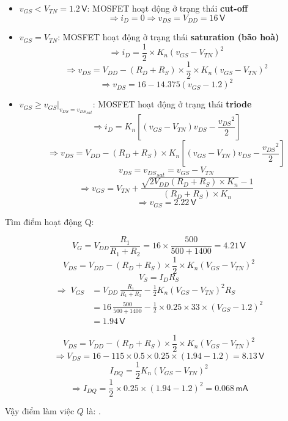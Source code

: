 \begin{itemize}[label=-]
	\item $v_{GS}<V_{TN}=1.2\,\textsf{V}$: MOSFET hoạt động ở trạng thái \textbf{cut-off}  
	\[
	\Rightarrow i_{D}=0 \Rightarrow v_{DS}=V_{DD}=16\,\textsf{V}
	\]
	
	\item $v_{GS}=V_{TN}$: MOSFET hoạt động ở trạng thái \textbf{saturation (bão hoà)}  
	\[
	\Rightarrow i_{D}=\frac{1}{2}\times K_{n}\left(v_{GS}-V_{TN}\right)^{2}
	\]
	\[
	\Rightarrow v_{DS}=V_{DD}-\left(R_{D}+R_{S}\right)\times\frac{1}{2}\times K_{n}\left(v_{GS}-V_{TN}\right)^{2}
	\]
	\[
	\Rightarrow v_{DS}=16-14.375\left(v_{GS}-1.2\right)^{2}
	\]
	
	\item $v_{GS}\geq\left.v_{GS}\right|_{v_{DS}={v_{DS}}_{sat}}$: MOSFET hoạt động ở trạng thái \textbf{triode}  
	\[
	\Rightarrow i_{D}=K_{n}\left[\left(v_{GS}-V_{TN}\right)v_{DS}-\frac{{v_{DS}}^{2}}{2}\right]
	\]
	\[
	\Rightarrow v_{DS}=V_{DD}-\left(R_{D}+R_{S}\right)\times K_{n}\left[\left(v_{GS}-V_{TN}\right)v_{DS}-\frac{{v_{DS}}^{2}}{2}\right]
	\]
	\[
	v_{DS}={v_{DS}}_{sat}=v_{GS}-V_{TN}
	\]
	\[
	\Rightarrow v_{GS}=V_{TN}+\frac{\sqrt{2V_{DD}\left(R_{D}+R_{S}\right)\times K_{n}}-1}{\left(R_{D}+R_{S}\right)\times K_{n}}
	\]
	\[
	\Rightarrow v_{GS}=2.22\,\textsf{V}
	\]
\end{itemize}

Tìm điểm hoạt động Q:

\[
V_{G}=V_{DD} \frac{R_{1}}{R_{1}+R_{2}}=16\times\frac{500}{500+1400}=4.21\,\textsf{V}
\]
\[
V_{DS}=V_{DD}-\left(R_{D}+R_{S}\right)\times\frac{1}{2}\times K_{n}\left(V_{GS}-V_{TN}\right)^{2}
\]
\[
V_{S}=I_{D}  R_{S}
\]
\[
\begin{aligned}
	\Rightarrow\; V_{GS} &= V_{DD}\,\frac{R_{1}}{R_{1}+R_{2}}
	- \frac{1}{2} K_{n} (V_{GS}-V_{TN})^{2} R_{S} \\[6pt]
	&= 16\,\frac{500}{500+1400}
	- \frac{1}{2}\times 0.25 \times 33 \times (V_{GS}-1.2)^{2} \\[6pt]
	&= 1.94\,\textsf{V}
\end{aligned}
\]

\[
V_{DS}=V_{DD}-\left(R_{D}+R_{S}\right)\times\frac{1}{2}\times K_{n}\left(V_{GS}-V_{TN}\right)^{2}
\]
\[
\Rightarrow V_{DS}=16-115\times0.5\times0.25\times\left(1.94-1.2\right)=8.13\,\textsf{V}
\]
\[
I_{DQ}=\frac{1}{2}K_{n}\left(V_{GS}-V_{TN}\right)^{2}
\]
\[
\Rightarrow I_{DQ}=\frac{1}{2}\times0.25\times\left(1.94-1.2\right)^{2}=0.068\,\textsf{mA}
\]

Vậy điểm làm việc $Q$ là: .


